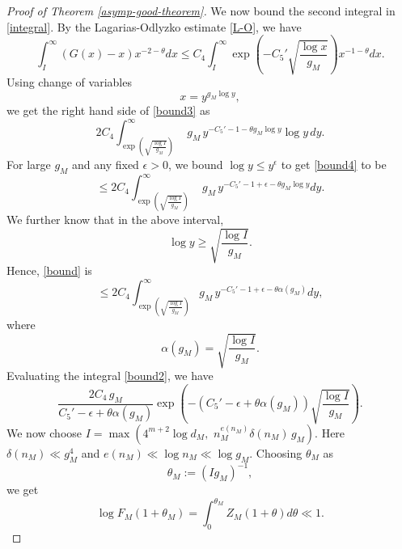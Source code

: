 \documentclass[12pt]{amsart}
\theoremstyle{definition}
\begin{document}
\begin{proof}[Proof of Theorem \ref{asymp-good-theorem}]
We now bound the second integral in \eqref{integral}. By the Lagarias-Odlyzko estimate \eqref{L-O}, we have
\begin{equation}\label{bound3}
\int_{I}^{\infty} (G(x) - x) x^{-2-\theta} dx \leq C_4 \int_{I}^{\infty} \exp \left(-C_5' \sqrt{\frac{\log x}{g_M}}\right) x^{-1-\theta} dx.
\end{equation}
Using change of variables
\begin{equation*}
x = y^{g_M \log y},
\end{equation*}
we get the right hand side of \eqref{bound3} as
\begin{equation}\label{bound4}
 2C_4 \int_{\exp \left( \sqrt{\frac{\log I}{g_M}} \right)}^\infty \,\, g_M \,
y^{-C_5' - 1 - \theta g_M \log y} \log y \, dy.
\end{equation}
For large $g_M$ and any fixed $\epsilon>0$, we bound $\log y \leq y^{\epsilon}$ to get \eqref{bound4} to be
\begin{equation}\label{bound}
 \leq 2C_4 \int_{\exp \left( \sqrt{\frac{\log I}{g_M}} \right)}^\infty \,\, g_M \, y^{-C_5' - 1+\epsilon - \theta g_M \log y} dy.
\end{equation}
We further know that in the above interval,
\begin{equation*}
\log y \geq \sqrt{\frac{\log I}{g_M}}.
\end{equation*}
Hence, \eqref{bound} is
\begin{equation}\label{bound2}
\leq 2C_4 \int_{\exp \left( \sqrt{\frac{\log I}{g_M}} \right)}^\infty g_M\, y^{-C_5' - 1+\epsilon - \theta \alpha(g_M)} dy,
\end{equation}
where 
\begin{equation*}
\alpha(g_M) = \sqrt{\frac{\log I}{g_M}}.
\end{equation*} 
Evaluating the integral \eqref{bound2}, we have
\begin{equation*}
\frac{2C_4\, g_M}{C_5' - \epsilon + \theta \alpha(g_M)} \exp \left( - (C_5' -\epsilon + \theta \alpha(g_M)) \sqrt{\frac{\log I}{g_M}} \right).
\end{equation*}
We now choose $I = \max\left(4^{m+2}\log d_M,\,\, n_M^{e(n_M)} \delta(n_M) \,g_M\right)$. Here $\delta(n_M)\ll g_M^4$ and $e(n_M)\ll \log n_M\ll \log g_M$. Choosing $\theta_M$ as
\begin{equation*}
\theta_M := (I g_M)^{-1},
\end{equation*}
we get
\begin{equation*}
\log F_M(1+\theta_M)= \int_{0}^{\theta_M} Z_M(1+\theta) d\theta \ll 1.
\end{equation*}

\end{proof}
\end{document}
